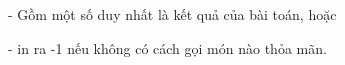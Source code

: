 - Gồm một số duy nhất là kết quả của bài toán, hoặc   


   - in ra -1 nếu không có cách gọi món nào thỏa mãn.
